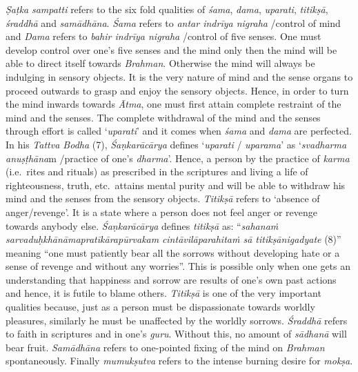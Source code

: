 \emph{Ṣaṭka} \emph{sampatti} refers to the six fold qualities of \emph{śama}, \emph{dama}, \emph{uparati}, \emph{titikṣā}, \emph{śraddhā} and \emph{samādhāna}. \emph{Śama} refers to \emph{antar indrīya nigraha} /control of mind and \emph{Dama} refers to \emph{bahir indrīya nigraha} /control of five senses. One must develop control over one's five senses and the mind only then the mind will be able to direct itself towards \emph{Brahman}. Otherwise the mind will always be indulging in sensory objects. It is the very nature of mind and the sense organs to proceed outwards to grasp and enjoy the sensory objects. Hence, in order to turn the mind inwards towards \emph{Ātma}, one must first attain complete restraint of the mind and the senses. The complete withdrawal of the mind and the senses through effort is called `\emph{uparati}' and it comes when \emph{śama} and \emph{dama} are perfected. In his \emph{Tattva Bodha} (7), \emph{Śaṇkarācārya} defines `\emph{uparati} / \emph{uparama}' as `\emph{svadharma} \emph{anuṣṭhāna}m /practice of one's \emph{dharma}'. Hence, a person by the practice of \emph{karma} (i.e.\ rites and rituals) as prescribed in the scriptures and living a life of righteousness, truth, etc.\ attains mental purity and will be able to withdraw his mind and the senses from the sensory objects. \emph{Titikṣā} refers to `absence of anger/revenge'. It is a state where a person does not feel anger or revenge towards anybody else. \emph{Śaṇkarācārya} defines \emph{titikṣā} as: ``\emph{sahanaṁ sarvaduḥkhānāmapratīkārapūrvakam } \emph{cintāvilāparahitaṁ sā titikṣānigadyate } (8)'' meaning ``one must patiently bear all the sorrows without developing hate or a sense of revenge and without any worries''. This is possible only when one gets an understanding that happiness and sorrow are results of one's own past actions and hence, it is futile to blame others. \emph{Titikṣā} is one of the very important qualities because, just as a person must be dispassionate towards worldly pleasures, similarly he must be unaffected by the worldly sorrows. \emph{Śraddhā} refers to faith in scriptures and in one's \emph{guru}. Without this, no amount of \emph{sādhanā} will bear fruit. \emph{Samādhāna} refers to one-pointed fixing of the mind on \emph{Brahman} spontaneously. Finally \emph{mumukṣutva} refers to the intense burning desire for \emph{mokṣa}.

